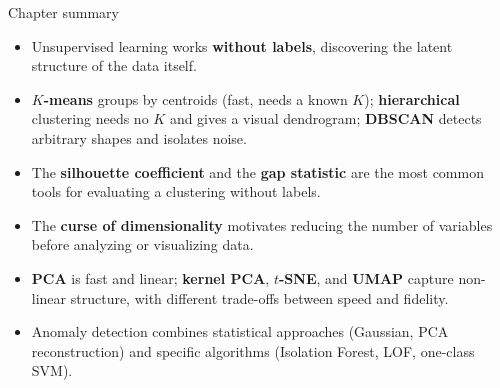 \documentclass[aspectratio=169]{beamer}
\begin{document}
\begin{frame}{Chapter summary}
  \small
  \begin{itemize}
    \item Unsupervised learning works \textbf{without labels}, discovering the latent structure of the data itself.
    \item \textbf{$K$-means} groups by centroids (fast, needs a known $K$); \textbf{hierarchical} clustering needs no $K$ and gives a visual dendrogram; \textbf{DBSCAN} detects arbitrary shapes and isolates noise.
    \item The \textbf{silhouette coefficient} and the \textbf{gap statistic} are the most common tools for evaluating a clustering without labels.
    \item The \textbf{curse of dimensionality} motivates reducing the number of variables before analyzing or visualizing data.
    \item \textbf{PCA} is fast and linear; \textbf{kernel PCA}, \textbf{$t$-SNE}, and \textbf{UMAP} capture non-linear structure, with different trade-offs between speed and fidelity.
    \item Anomaly detection combines statistical approaches (Gaussian, PCA reconstruction) and specific algorithms (Isolation Forest, LOF, one-class SVM).
  \end{itemize}
\end{frame}
\end{document}
